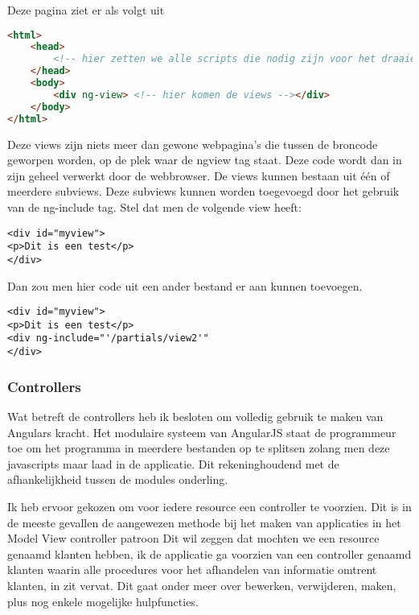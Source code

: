 \documentclass[a4paper,11pt]{article}
\begin{document}
Deze pagina ziet er als volgt uit
\begin{lstlisting}[language=html]
<html>
	<head>
		<!-- hier zetten we alle scripts die nodig zijn voor het draaien van de applicatie -->
	</head>
	<body>
		<div ng-view> <!-- hier komen de views --></div>
	</body>
</html>
\end{lstlisting}
Deze views zijn niets meer dan gewone webpagina's die tussen de broncode geworpen worden, op de plek waar de ngview tag staat. Deze code wordt dan in zijn geheel verwerkt door de webbrowser. De views kunnen bestaan uit één of meerdere subviews. Deze subviews kunnen worden toegevoegd door het gebruik van de ng-include tag. Stel dat men de volgende view heeft:
\begin{verbatim}
<div id="myview">
<p>Dit is een test</p>
</div>
\end{verbatim}
Dan zou men hier code uit een ander bestand er aan kunnen toevoegen.
\begin{verbatim}
<div id="myview">
<p>Dit is een test</p>
<div ng-include="'/partials/view2'"
</div>
\end{verbatim}

\subsubsection{Controllers}

Wat betreft de controllers heb ik besloten om volledig gebruik te maken van Angulars kracht. Het modulaire systeem van AngularJS staat de programmeur toe om het programma in meerdere bestanden op te splitsen zolang men deze javascripts maar laad in de applicatie. Dit rekeninghoudend met de afhankelijkheid tussen de modules onderling.

Ik heb ervoor gekozen om voor iedere resource een controller te voorzien. Dit is in de meeste gevallen de aangewezen methode bij het maken van applicaties in het Model View controller patroon %
Dit wil zeggen dat mochten we een resource genaamd klanten hebben, ik de applicatie ga voorzien van een controller genaamd klanten waarin alle procedures voor het afhandelen van informatie omtrent klanten, in zit vervat.  Dit gaat onder meer over bewerken, verwijderen, maken, plus nog enkele mogelijke hulpfuncties.
\end{document}
